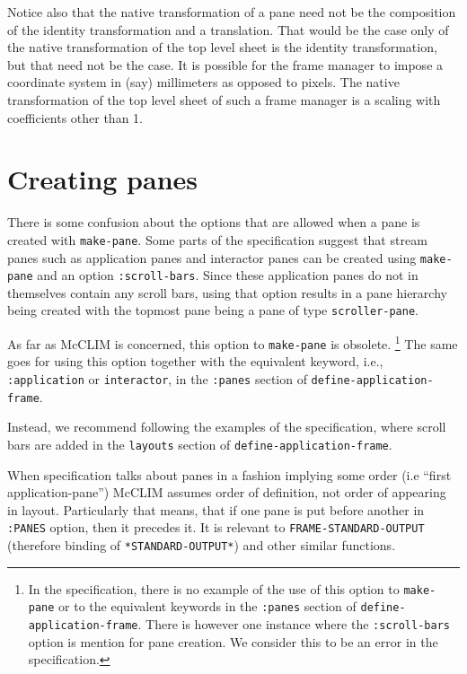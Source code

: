 Notice also that the native transformation of a pane need not be the
composition of the identity transformation and a translation.  That
would be the case only of the native transformation of the top level
sheet is the identity transformation, but that need not be the case.  It
is possible for the frame manager to impose a coordinate system in (say)
millimeters as opposed to pixels.  The native transformation of the top
level sheet of such a frame manager is a scaling with coefficients other
than 1.

\section{Creating panes}
\label{sec-panes-creating}

There is some confusion about the options that are allowed when a pane
is created with \texttt{make-pane}.  Some parts of the specification
suggest that stream panes such as application panes and interactor
panes can be created using \texttt{make-pane} and an option
\texttt{:scroll-bars}.  Since these application panes do not in
themselves contain any scroll bars, using that option results in a
pane hierarchy being created with the topmost pane being a pane of
type \texttt{scroller-pane}.

As far as McCLIM is concerned, this option to \texttt{make-pane} is
obsolete.%
\footnote{In the specification, there is no example of the use of this
  option to \texttt{make-pane} or to the equivalent keywords in the
  \texttt{:panes} section of \texttt{define-application-frame}.  There
  is however one instance where the \texttt{:scroll-bars} option is
  mention for pane creation.  We consider this to be an error in the
  specification.}
The same goes for using this option together with the equivalent
keyword, i.e., \texttt{:application} or \texttt{interactor}, in the
\texttt{:panes} section of \texttt{define-application-frame}.

Instead, we recommend following the examples of the specification,
where scroll bars are added in the \texttt{layouts} section of
\texttt{define-application-frame}.


When specification talks about panes in a fashion implying some order
(i.e ``first application-pane'') McCLIM assumes order of definition,
not order of appearing in layout. Particularly that means, that if one
pane is put before another in \texttt{:PANES} option, then it precedes
it. It is relevant to \texttt{FRAME-STANDARD-OUTPUT} (therefore
binding of \texttt{*STANDARD-OUTPUT*}) and other similar functions.

